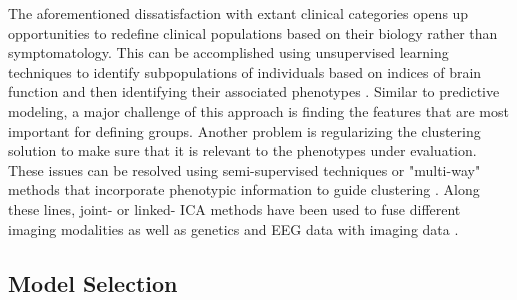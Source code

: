 The aforementioned dissatisfaction with extant clinical categories opens up opportunities to redefine clinical populations based on their biology rather than symptomatology. This can be accomplished using unsupervised learning techniques to identify subpopulations of individuals based on indices of brain function and then identifying their associated phenotypes \cite{Gates2014}. Similar to predictive modeling, a major challenge of this approach is finding the features that are most important for defining groups. Another problem is regularizing the clustering solution to make sure that it is relevant to the phenotypes under evaluation. These issues can be resolved using semi-supervised techniques or "multi-way" methods that incorporate phenotypic information to guide clustering \cite{Morup2011}. Along these lines, joint- or linked- ICA methods have been used to fuse different imaging modalities \cite{Franco2008, Groves2011} as well as genetics and EEG data with imaging data \cite{Calhoun2009}. 

\subsection{Model Selection}

